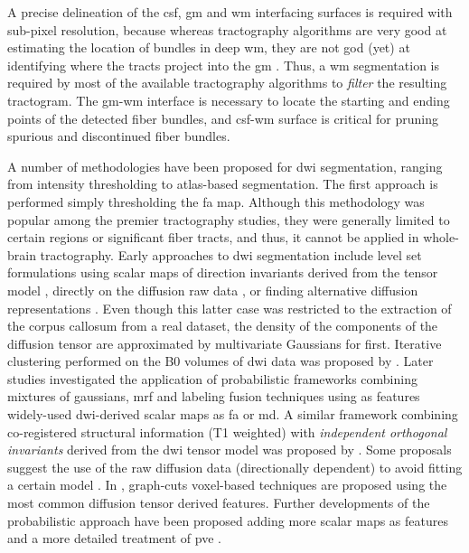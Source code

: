 A precise delineation of the \gls{csf}, \gls{gm} and \gls{wm} interfacing surfaces
is required with sub-pixel resolution, because whereas tractography algorithms are
very good at estimating the location of bundles in deep \gls{wm}, they are not
god (yet) at identifying where the tracts project into the \gls{gm} 
\citep{jbabdi_tractography:_2011,craddock_imaging_2013}.
Thus, a \gls{wm} segmentation is required by most of the available tractography 
algorithms to \emph{filter} the resulting tractogram. The \gls{gm}-\gls{wm}
interface is necessary to locate the starting and ending points of the detected
fiber bundles, and \gls{csf}-\gls{wm} surface is critical for pruning spurious 
and discontinued fiber bundles.

A number of methodologies have been proposed for \gls{dwi} segmentation, ranging 
from intensity thresholding to atlas-based segmentation. 
The first approach is performed simply thresholding the \gls{fa} map.
Although this methodology was popular among the premier tractography studies,
they were generally limited to certain regions or significant fiber tracts, and thus,
it cannot be applied in whole-brain tractography. Early approaches to \gls{dwi} segmentation 
include level set formulations using scalar maps of direction invariants derived
from the tensor model \citep{zhukov_level_2003}, directly on the diffusion raw data
\citep{rousson_level_2004}, or finding alternative diffusion representations 
\citep{jonasson_representing_2007}. Even though this latter case was restricted to the extraction of
the corpus callosum from a real dataset, the density of the components of the diffusion tensor
are approximated by multivariate Gaussians for first. Iterative clustering performed on the 
B0 volumes of \gls{dwi} data was proposed by \citep{hadjiprocopis_unbiased_2005}.
Later studies investigated the application of probabilistic frameworks combining mixtures of 
gaussians, \gls{mrf} and labeling fusion techniques \citep{liu_brain_2007} using as features 
widely-used \gls{dwi}-derived scalar maps as \gls{fa} or \gls{md}. A similar framework 
combining co-registered structural information (T1 weighted) with \emph{independent orthogonal 
invariants} derived from the \gls{dwi} tensor model was proposed by \citep{awate_multivariate_2008}. 
Some proposals suggest the use of the raw diffusion data (directionally dependent) to avoid fitting 
a certain model \citep{lu_segmentation_2008}. In \citep{han_experimental_2009}, graph-cuts 
voxel-based techniques are proposed using the most common diffusion tensor derived features.
Further developments of the probabilistic approach have been proposed adding more scalar maps
as features and a more detailed treatment of \gls{pve} \citep{kumazawa_partial_2010}.

